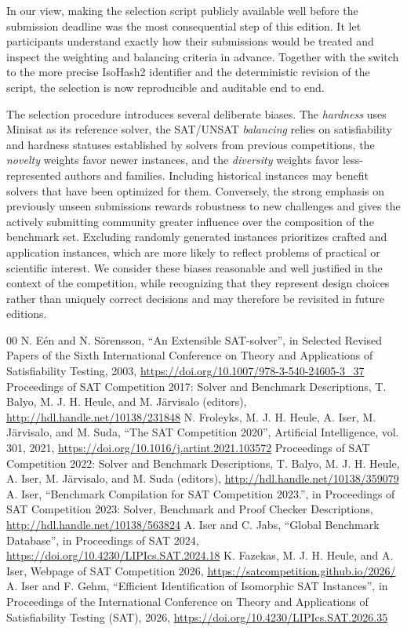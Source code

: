 \documentclass[conference]{IEEEtran}
\begin{document}
In our view, making the selection script publicly available well before the submission deadline was the most consequential step of this edition.
It let participants understand exactly how their submissions would be treated and inspect the weighting and balancing criteria in advance.
Together with the switch to the more precise IsoHash2 identifier and the deterministic revision of the script, the selection is now reproducible and auditable end to end.

The selection procedure introduces several deliberate biases.
The \emph{hardness} uses Minisat as its reference solver, the SAT/UNSAT \emph{balancing} relies on satisfiability and hardness statuses established by solvers from previous competitions, the \emph{novelty} weights favor newer instances, and the \emph{diversity} weights favor less-represented authors and families.
Including historical instances may benefit solvers that have been optimized for them.
Conversely, the strong emphasis on previously unseen submissions rewards robustness to new challenges and gives the actively submitting community greater influence over the composition of the benchmark set.
Excluding randomly generated instances prioritizes crafted and application instances, which are more likely to reflect problems of practical or scientific interest.
We consider these biases reasonable and well justified in the context of the competition, while recognizing that they represent design choices rather than uniquely correct decisions and may therefore be revisited in future editions.

\begin{thebibliography}{00}
     N. Eén and N. Sörensson, ``An Extensible SAT-solver'', in Selected Revised Papers of the Sixth International Conference on Theory and Applications of Satisfiability Testing, 2003, \url{https://doi.org/10.1007/978-3-540-24605-3_37}
     Proceedings of SAT Competition 2017: Solver and Benchmark Descriptions, T. Balyo, M. J. H. Heule, and M. Järvisalo (editors), \url{http://hdl.handle.net/10138/231848}
     N. Froleyks, M. J. H. Heule, A. Iser, M. Järvisalo, and M. Suda, ``The SAT Competition 2020'', Artificial Intelligence, vol. 301, 2021, \url{https://doi.org/10.1016/j.artint.2021.103572}
     Proceedings of SAT Competition 2022: Solver and Benchmark Descriptions, T. Balyo, M. J. H. Heule, A. Iser, M. Järvisalo, and M. Suda (editors), \url{http://hdl.handle.net/10138/359079}
     A. Iser, ``Benchmark Compilation for SAT Competition 2023.'', in Proceedings of SAT Competition 2023: Solver, Benchmark and Proof Checker Descriptions, \url{http://hdl.handle.net/10138/563824}
     A. Iser and C. Jabs, ``Global Benchmark Database'', in Proceedings of SAT 2024, \url{https://doi.org/10.4230/LIPIcs.SAT.2024.18}
     K. Fazekas, M. J. H. Heule, and A. Iser, Webpage of SAT Competition 2026, \url{https://satcompetition.github.io/2026/}
     A. Iser and F. Gehm, ``Efficient Identification of Isomorphic SAT Instances'', in Proceedings of the International Conference on Theory and Applications of Satisfiability Testing (SAT), 2026, \url{https://doi.org/10.4230/LIPIcs.SAT.2026.35}
\end{thebibliography}
\end{document}
